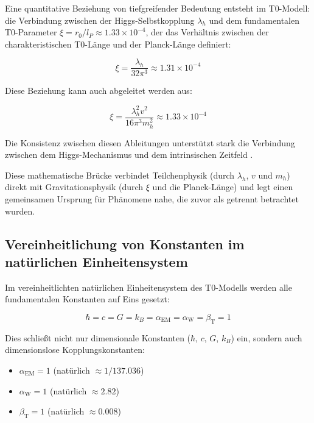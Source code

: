 \documentclass[12pt,a4paper]{article}
\newcommand{\alphaEM}{\alpha_{\text{EM}}}
\newcommand{\alphaW}{\alpha_{\text{W}}}
\newcommand{\betaT}{\beta_{\text{T}}}
\begin{document}
	Eine quantitative Beziehung von tiefgreifender Bedeutung entsteht im T0-Modell: die Verbindung zwischen der Higgs-Selbstkopplung $\lambda_h$ und dem fundamentalen T0-Parameter $\xi = r_0/l_P \approx 1.33 \times 10^{-4}$, der das Verhältnis zwischen der charakteristischen T0-Länge und der Planck-Länge definiert:
	
	\begin{equation}
		\xi = \frac{\lambda_h}{32\pi^3} \approx 1.31 \times 10^{-4}
	\end{equation}
	
	Diese Beziehung kann auch abgeleitet werden aus:
	
	\begin{equation}
		\xi = \frac{\lambda_h^2 v^2}{16\pi^3 m_h^2} \approx 1.33 \times 10^{-4}
	\end{equation}
	
	Die Konsistenz zwischen diesen Ableitungen unterstützt stark die Verbindung zwischen dem Higgs-Mechanismus und dem intrinsischen Zeitfeld \cite{pascher_alphabeta_2025}.
	
	Diese mathematische Brücke verbindet Teilchenphysik (durch $\lambda_h$, $v$ und $m_h$) direkt mit Gravitationsphysik (durch $\xi$ und die Planck-Länge) und legt einen gemeinsamen Ursprung für Phänomene nahe, die zuvor als getrennt betrachtet wurden.
	
	\subsection{Vereinheitlichung von Konstanten im natürlichen Einheitensystem}
	\label{subsec:unified_constants}
	
	Im vereinheitlichten natürlichen Einheitensystem des T0-Modells werden alle fundamentalen Konstanten auf Eins gesetzt:
	
	\begin{equation}
		\hbar = c = G = k_B = \alphaEM = \alphaW = \betaT = 1
	\end{equation}
	
	Dies schließt nicht nur dimensionale Konstanten ($\hbar$, $c$, $G$, $k_B$) ein, sondern auch dimensionslose Kopplungskonstanten:
	
	\begin{itemize}
		\item $\alphaEM = 1$ (natürlich $\approx 1/137.036$)
		\item $\alphaW = 1$ (natürlich $\approx 2.82$)
		\item $\betaT = 1$ (natürlich $\approx 0.008$)
	\end{itemize}
	
\end{document}
